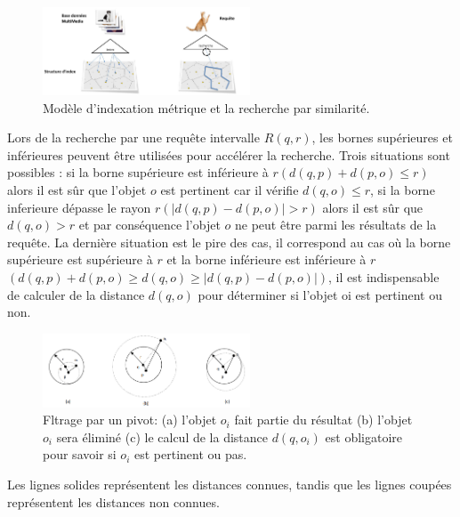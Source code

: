 \begin{figure}[H]
	\centering
	\includegraphics[width=0.55\textwidth]{Figures/similarity.png} %
	\caption{Modèle d'indexation métrique et la recherche par similarité.}
\end{figure}

Lors de la recherche par une requête intervalle $ R(q,r) $, les bornes supérieures et inférieures peuvent être utilisées pour accélérer la recherche. Trois situations sont possibles : si la borne supérieure est inférieure à $  r (d(q,p)+d(p,o) \leq r ) $ alors il est sûr que l’objet $ o $ est pertinent car il vérifie $ d(q,o) \leq r $, si la borne inferieure dépasse le rayon $ r ( |d(q,p)-d(p,o)| > r )  $ alors il est sûr que $ d(q,o) > r $ et par conséquence l’objet $ o $ ne peut être parmi les résultats de la requête. La dernière situation est le pire des cas, il correspond au cas où la borne supérieure est supérieure à $ r $ et la borne inférieure est inférieure à  $ r $  $  (d(q,p)+d(p,o) \geq d(q,o)\geq |d(q,p)-d(p,o)|) $, il est indispensable de calculer de la distance $ d(q,o) $ pour déterminer si l’objet oi est pertinent ou non.

\begin{figure}[H]
	\centering
	\includegraphics[width=0.55\textwidth]{Figures/pivot.png} %
	\caption{Fltrage par un pivot: (a) l'objet $  o_i $ fait partie du résultat (b) l'objet $ o_i $ sera éliminé (c) le calcul de la
		distance $ d(q,o_i) $ est obligatoire pour savoir si $ o_i $ est pertinent ou pas.}
\end{figure}

Les lignes solides représentent les distances connues, tandis que les lignes coupées représentent les distances non connues.

